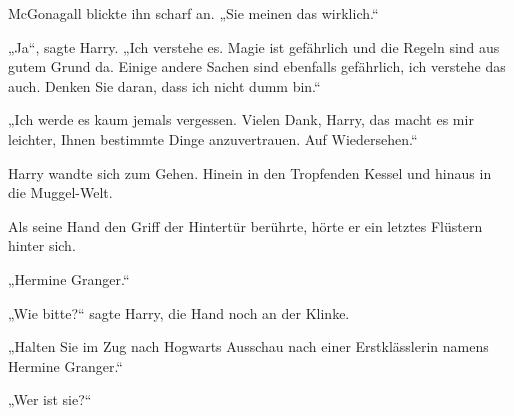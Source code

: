 McGonagall blickte ihn scharf an.
„Sie meinen das wirklich.“

„Ja“, sagte Harry.
„Ich verstehe es. Magie ist gefährlich und die Regeln sind aus gutem Grund da. Einige andere Sachen sind ebenfalls gefährlich, ich verstehe das auch. Denken Sie daran, dass ich nicht dumm bin.“

„Ich werde es kaum jemals vergessen. Vielen Dank, Harry, das macht es mir leichter, Ihnen bestimmte Dinge anzuvertrauen. Auf Wiedersehen.“

Harry wandte sich zum Gehen. Hinein in den Tropfenden Kessel und hinaus in die Muggel-Welt.

Als seine Hand den Griff der Hintertür berührte, hörte er ein letztes Flüstern hinter sich.

„Hermine Granger.“

„Wie bitte?“ sagte Harry, die Hand noch an der Klinke.

„Halten Sie im Zug nach Hogwarts Ausschau nach einer Erstklässlerin namens Hermine Granger.“

„Wer ist sie?“

